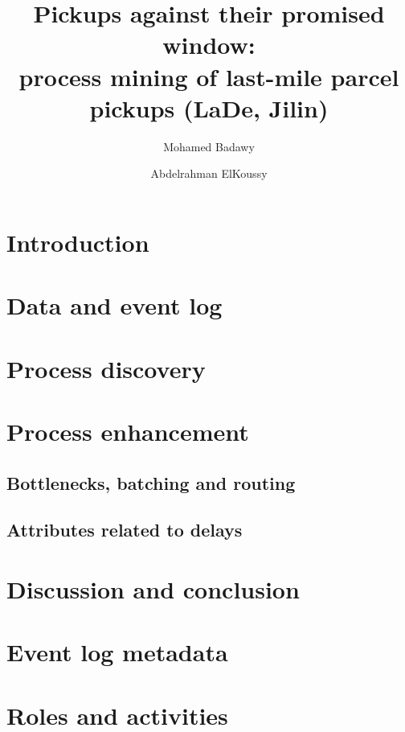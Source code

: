 \documentclass[runningheads]{llncs}
\begin{document}
\title{Pickups against their promised window:\\process mining of last-mile parcel pickups (LaDe, Jilin)}
\author{Mohamed Badawy \and Abdelrahman ElKoussy}
\maketitle

\begin{abstract}
\end{abstract}

\section{Introduction}            %
\section{Data and event log}      %
\section{Process discovery}       %
\section{Process enhancement}
\subsection{Bottlenecks, batching and routing}   %
\subsection{Attributes related to delays}       %
\section{Discussion and conclusion}              %




\appendix
\section{Event log metadata}      %
\section{Roles and activities}    %
\end{document}
